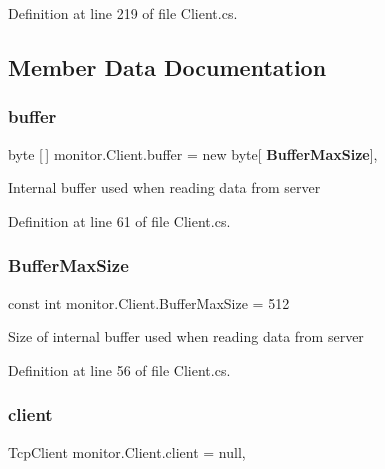 Definition at line 219 of file Client.\+cs.



\subsection{Member Data Documentation}
\mbox{\label{classmonitor_1_1_client_abd5c33a23e0fab7b369b59ac296c7762}} 
\subsubsection{buffer}
{\footnotesize\ttfamily byte [$\,$] monitor.\+Client.\+buffer = new byte[\textbf{ Buffer\+Max\+Size}]\hspace{0.3cm}{\ttfamily [static]}, {\ttfamily [private]}}



Internal buffer used when reading data from server 



Definition at line 61 of file Client.\+cs.

\mbox{\label{classmonitor_1_1_client_acbc4cae14536eccb5297aacdadb84f29}} 
\subsubsection{Buffer\+Max\+Size}
{\footnotesize\ttfamily const int monitor.\+Client.\+Buffer\+Max\+Size = 512\hspace{0.3cm}{\ttfamily [private]}}



Size of internal buffer used when reading data from server 



Definition at line 56 of file Client.\+cs.

\mbox{\label{classmonitor_1_1_client_a4867b48ebfa930a80662c552f2911430}} 
\subsubsection{client}
{\footnotesize\ttfamily Tcp\+Client monitor.\+Client.\+client = null\hspace{0.3cm}{\ttfamily [static]}, {\ttfamily [private]}}




